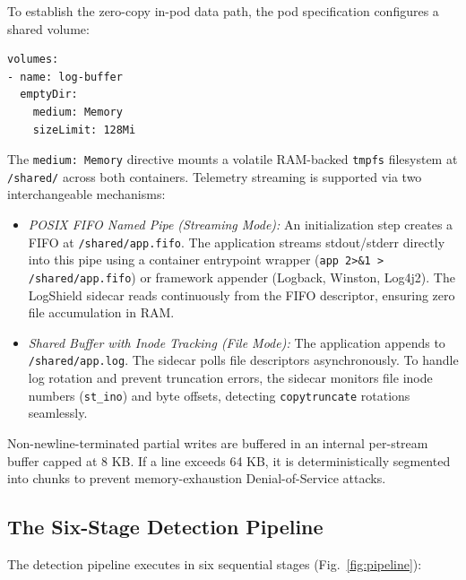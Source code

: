 \documentclass[conference]{IEEEtran}
\begin{document}
To establish the zero-copy in-pod data path, the pod specification configures a shared volume:
\begin{lstlisting}[language=XML]
volumes:
- name: log-buffer
  emptyDir:
    medium: Memory
    sizeLimit: 128Mi
\end{lstlisting}
The \texttt{medium: Memory} directive mounts a volatile RAM-backed \texttt{tmpfs} filesystem at \texttt{/shared/} across both containers. Telemetry streaming is supported via two interchangeable mechanisms:
\begin{itemize}
    \item \textit{POSIX FIFO Named Pipe (Streaming Mode):} An initialization step creates a FIFO at \texttt{/shared/app.fifo}. The application streams stdout/stderr directly into this pipe using a container entrypoint wrapper (\texttt{app 2>\&1 > /shared/app.fifo}) or framework appender (Logback, Winston, Log4j2). The LogShield sidecar reads continuously from the FIFO descriptor, ensuring zero file accumulation in RAM.
    \item \textit{Shared Buffer with Inode Tracking (File Mode):} The application appends to \texttt{/shared/app.log}. The sidecar polls file descriptors asynchronously. To handle log rotation and prevent truncation errors, the sidecar monitors file inode numbers (\texttt{st\_ino}) and byte offsets, detecting \texttt{copytruncate} rotations seamlessly.
\end{itemize}
Non-newline-terminated partial writes are buffered in an internal per-stream buffer capped at 8 KB. If a line exceeds 64 KB, it is deterministically segmented into chunks to prevent memory-exhaustion Denial-of-Service attacks.

\subsection{The Six-Stage Detection Pipeline}
The detection pipeline executes in six sequential stages (Fig.~\ref{fig:pipeline}):
\end{document}
